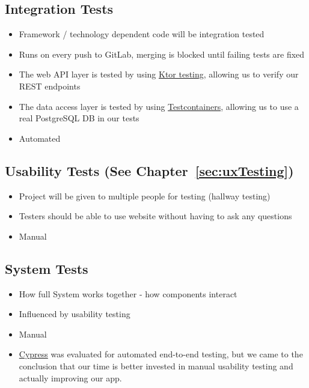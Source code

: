 \subsection{Integration Tests}
\begin{itemize}
    \item Framework / technology dependent code will be integration tested
    \item Runs on every push to GitLab, merging is blocked until failing tests are fixed
    \item The web API layer is tested by using \hyperlink{https://ktor.io/docs/testing.html}{Ktor testing}, allowing us to verify our REST endpoints
    \item The data access layer is tested by using \hyperlink{https://www.testcontainers.org/}{Testcontainers}, allowing us to use a real PostgreSQL DB in our tests
    \item Automated
\end{itemize}

\subsection{Usability Tests (See Chapter~\ref{sec:uxTesting})}
\begin{itemize}
    \item Project will be given to multiple people for testing (hallway testing)
    \item Testers should be able to use website without having to ask any questions
    \item Manual
\end{itemize}

\subsection{System Tests}
\begin{itemize}
    \item How full System works together - how components interact
    \item Influenced by usability testing
    \item Manual
    \item \hyperlink{https://www.cypress.io}{Cypress} was evaluated for automated end-to-end testing, but we came to the conclusion that our time is better invested in manual usability testing and actually improving our app.
\end{itemize}


